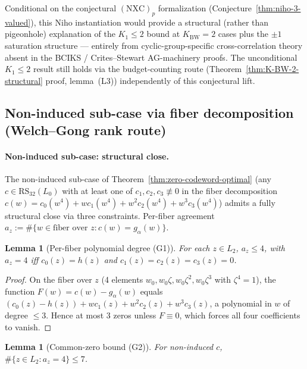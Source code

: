 \documentclass[11pt]{article}
\newtheorem{lemma}[theorem]{Lemma}
\theoremstyle{definition}
\theoremstyle{remark}
\begin{document}
Conditional on the conjectural $(\mathrm{NXC})_p$ formalization
(Conjecture~\ref{thm:niho-3-valued}), this Niho instantiation would
provide a structural (rather than pigeonhole) explanation of the
$K_1 \leq 2$ bound at $K_{\mathrm{BW}}=2$ cases plus the $\pm 1$
saturation structure --- entirely from cyclic-group-specific
cross-correlation theory absent in the BCIKS / Crites--Stewart
AG-machinery proofs. The unconditional $K_1 \leq 2$ result still
holds via the budget-counting route (Theorem~\ref{thm:K-BW-2-structural}
proof, lemma~(L3)) independently of this conjectural lift.


\subsection{Non-induced sub-case via fiber decomposition (Welch--Gong rank route)}
\label{app:layer3-noninduced}

\paragraph{Non-induced sub-case: structural close.}
The non-induced sub-case of Theorem~\ref{thm:zero-codeword-optimal}
(any $c \in \mathrm{RS}_{32}(L_0)$ with at least one of
$c_1, c_2, c_3 \not\equiv 0$ in the fiber decomposition $c(w) = c_0(w^4) +
w c_1(w^4) + w^2 c_2(w^4) + w^3 c_3(w^4)$) admits a fully structural
close via three constraints. Per-fiber agreement $a_z := \#\{w \in \text{fiber over } z : c(w) = g_\alpha(w)\}$.

\begin{lemma}[Per-fiber polynomial degree (G1)]
\label{lem:per-fiber-degree}
For each $z \in L_2$, $a_z \leq 4$, with $a_z = 4$ iff
$c_0(z) = h(z)$ and $c_1(z) = c_2(z) = c_3(z) = 0$.
\end{lemma}

\begin{proof}
On the fiber over $z$ (4 elements $w_0, w_0\zeta, w_0\zeta^2, w_0\zeta^3$
with $\zeta^4 = 1$), the function $F(w) = c(w) - g_\alpha(w)$ equals
$(c_0(z) - h(z)) + w c_1(z) + w^2 c_2(z) + w^3 c_3(z)$, a polynomial
in $w$ of degree $\leq 3$. Hence at most 3 zeros unless $F \equiv 0$,
which forces all four coefficients to vanish.
\end{proof}

\begin{lemma}[Common-zero bound (G2)]
\label{lem:common-zero-bound}
For non-induced $c$, $\#\{z \in L_2 : a_z = 4\} \leq 7$.
\end{lemma}
\end{document}
